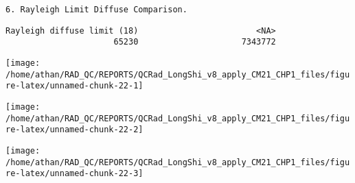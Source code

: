 \documentclass[
  10pt,
  a4paper,oneside]{article}
\newenvironment{Shaded}{\begin{snugshade}}{\end{snugshade}}
\newcommand{\CommentTok}[1]{\textcolor[rgb]{0.56,0.35,0.01}{\textit{#1}}}
\newcommand{\DataTypeTok}[1]{\textcolor[rgb]{0.13,0.29,0.53}{#1}}
\newcommand{\DecValTok}[1]{\textcolor[rgb]{0.00,0.00,0.81}{#1}}
\newcommand{\ErrorTok}[1]{\textcolor[rgb]{0.64,0.00,0.00}{\textbf{#1}}}
\newcommand{\KeywordTok}[1]{\textcolor[rgb]{0.13,0.29,0.53}{\textbf{#1}}}
\newcommand{\NormalTok}[1]{#1}
\newcommand{\OperatorTok}[1]{\textcolor[rgb]{0.81,0.36,0.00}{\textbf{#1}}}
\newcommand{\OtherTok}[1]{\textcolor[rgb]{0.56,0.35,0.01}{#1}}
\newcommand{\StringTok}[1]{\textcolor[rgb]{0.31,0.60,0.02}{#1}}
\begin{document}
\begin{Shaded}
\end{Shaded}

\begin{verbatim}
6. Rayleigh Limit Diffuse Comparison.
\end{verbatim}

\begin{verbatim}
Rayleigh diffuse limit (18)                        <NA> 
                      65230                     7343772 
\end{verbatim}

\begin{center}\texttt{[image: /home/athan/RAD\_QC/REPORTS/QCRad\_LongShi\_v8\_apply\_CM21\_CHP1\_files/figure-latex/unnamed-chunk-22-1]} \end{center}

\begin{center}\texttt{[image: /home/athan/RAD\_QC/REPORTS/QCRad\_LongShi\_v8\_apply\_CM21\_CHP1\_files/figure-latex/unnamed-chunk-22-2]} \end{center}

\begin{center}\texttt{[image: /home/athan/RAD\_QC/REPORTS/QCRad\_LongShi\_v8\_apply\_CM21\_CHP1\_files/figure-latex/unnamed-chunk-22-3]} \end{center}
\end{document}
